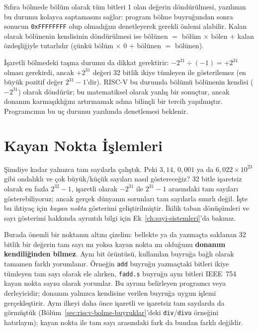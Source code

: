 Sıfıra bölmede bölüm olarak tüm bitleri 1 olan değerin döndürülmesi, yazılımın bu durumu kolayca saptamasını sağlar: program bölme buyruğundan sonra sonucun \texttt{0xFFFFFFFF} olup olmadığını denetleyerek gerekli önlemi alabilir. Kalan olarak bölünenin kendisinin döndürülmesi ise bölünen $=$ bölüm $\times$ bölen $+$ kalan özdeşliğiyle tutarlıdır (çünkü bölüm $\times$ 0 $+$ bölünen $=$ bölünen).

İşaretli bölmedeki taşma durumu da dikkat gerektirir: $-2^{31} \div (-1) = +2^{31}$ olması gerekirdi, ancak $+2^{31}$ değeri 32 bitlik ikiye tümleyen ile gösterilemez (en büyük pozitif değer $2^{31}-1$'dir). RISC-V bu durumda bölümü bölünenin kendisi ($-2^{31}$) olarak döndürür; bu matematiksel olarak yanlış bir sonuçtur, ancak donanım karmaşıklığını artırmamak adına bilinçli bir tercih yapılmıştır. Programcının bu uç durumu yazılımda denetlemesi beklenir.


\section{Kayan Nokta İşlemleri}
\label{sec:kayan-nokta}

Şimdiye kadar yalnızca tam sayılarla çalıştık. Peki $3{,}14$, $0{,}001$ ya da $6{,}022 \times 10^{23}$ gibi ondalıklı ve çok büyük/küçük sayıları nasıl göstereceğiz? 32 bitle işaretsiz olarak en fazla $2^{32}-1$, işaretli olarak $-2^{31}$ ile $2^{31}-1$ arasındaki tam sayıları gösterebiliyoruz; ancak gerçek dünyanın sorunları tam sayılarla sınırlı değil. İşte bu ihtiyaç için \emph{kayan nokta} gösterimi geliştirilmiştir. İkilik taban dönüşümleri ve sayı gösterimi hakkında ayrıntılı bilgi için Ek~\ref{ch:sayi-sistemleri}'da bakınız.

Burada önemli bir noktanın altını çizelim: bellekte ya da yazmaçta saklanan 32 bitlik bir değerin tam sayı mı yoksa kayan nokta mı olduğunu \textbf{donanım kendiliğinden bilmez}. Aynı bit örüntüsü, kullanılan buyruğa bağlı olarak tamamen farklı yorumlanır. Örneğin \texttt{add} buyruğu yazmaçtaki bitleri ikiye tümleyen tam sayı olarak ele alırken, \texttt{fadd.s} buyruğu aynı bitleri IEEE~754 kayan nokta sayısı olarak yorumlar. Bu ayrımı belirleyen programcı veya derleyicidir; donanım yalnızca kendisine verilen buyruğa uygun işlemi gerçekleştirir. Aynı ilkeyi daha önce işaretli ve işaretsiz tam sayılarda da görmüştük (Bölüm~\ref{sec:riscv-bolme-buyruklar}'deki \texttt{div}/\texttt{divu} örneğini hatırlayın); kayan nokta ile tam sayı arasındaki fark da bundan farklı değildir.

